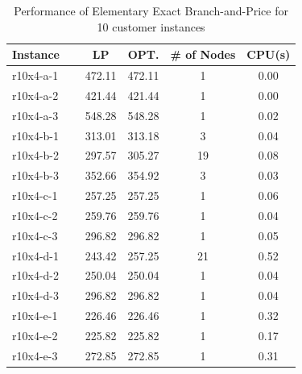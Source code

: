 \begin{table}[ht]
\centering
\caption{Performance of Elementary Exact Branch-and-Price for 10 customer instances}\label{gr1-10}
\begin {tabular}[t]{|l|c|c|c|c|}  
\hline
Instance & LP & OPT. & \# of Nodes & CPU(s) \\\hline
r10x4-a-1 \ \	&	472.11	&	472.11	&	1	&	0.00	\\
r10x4-a-2 \ \	&	421.44	&	421.44	&	1	&	0.00	\\
r10x4-a-3 \ \	&	548.28	&	548.28	&	1	&	0.02	\\
r10x4-b-1 \ \	&	313.01	&	313.18	&	3	&	0.04	\\
r10x4-b-2 \ \	&	297.57	&	305.27	&	19	&	0.08	\\
r10x4-b-3 \ \	&	352.66	&	354.92	&	3	&	0.03	\\
r10x4-c-1 \ \	&	257.25	&	257.25	&	1	&	0.06	\\
r10x4-c-2 \ \	&	259.76	&	259.76	&	1	&	0.04	\\
r10x4-c-3 \ \	&	296.82	&	296.82	&	1	&	0.05	\\
r10x4-d-1 \ \	&	243.42	&	257.25	&	21	&	0.52	\\
r10x4-d-2 \ \	&	250.04	&	250.04	&	1	&	0.04	\\
r10x4-d-3 \ \	&	296.82	&	296.82	&	1	&	0.04	\\
r10x4-e-1 \ \	&	226.46	&	226.46	&	1	&	0.32	\\
r10x4-e-2 \ \	&	225.82	&	225.82	&	1	&	0.17	\\
r10x4-e-3 \ \	&	272.85	&	272.85	&	1       &	0.31	\\
\hline
\end{tabular}
\end{table} 

